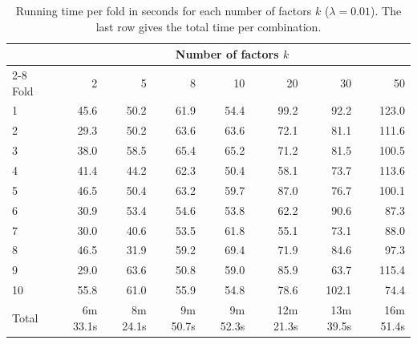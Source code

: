 	\begin{table}[ht]
		\centering
		\caption{Running time per fold in seconds for each number of factors $k$
			($\lambda = 0.01$). The last row gives the total time per combination.}
		\label{tab:fold-time}
		\begin{tabular}{@{}lrrrrrrr@{}}
			\toprule
			& \multicolumn{7}{c}{Number of factors $k$} \\
			\cmidrule(l){2-8}
			Fold & 2 & 5 & 8 & 10 & 20 & 30 & 50 \\
			\midrule
			1  & 45.6 & 50.2 & 61.9 & 54.4 &  99.2 &  92.2 & 123.0 \\
			2  & 29.3 & 50.2 & 63.6 & 63.6 &  72.1 &  81.1 & 111.6 \\
			3  & 38.0 & 58.5 & 65.4 & 65.2 &  71.2 &  81.5 & 100.5 \\
			4  & 41.4 & 44.2 & 62.3 & 50.4 &  58.1 &  73.7 & 113.6 \\
			5  & 46.5 & 50.4 & 63.2 & 59.7 &  87.0 &  76.7 & 100.1 \\
			6  & 30.9 & 53.4 & 54.6 & 53.8 &  62.2 &  90.6 &  87.3 \\
			7  & 30.0 & 40.6 & 53.5 & 61.8 &  55.1 &  73.1 &  88.0 \\
			8  & 46.5 & 31.9 & 59.2 & 69.4 &  71.9 &  84.6 &  97.3 \\
			9  & 29.0 & 63.6 & 50.8 & 59.0 &  85.9 &  63.7 & 115.4 \\
			10 & 55.8 & 61.0 & 55.9 & 54.8 &  78.6 & 102.1 &  74.4 \\
			\midrule
			Total & 6m 33.1s & 8m 24.1s & 9m 50.7s & 9m 52.3s & 12m 21.3s & 13m 39.5s & 16m 51.4s \\
			\bottomrule
		\end{tabular}
	\end{table}
	
